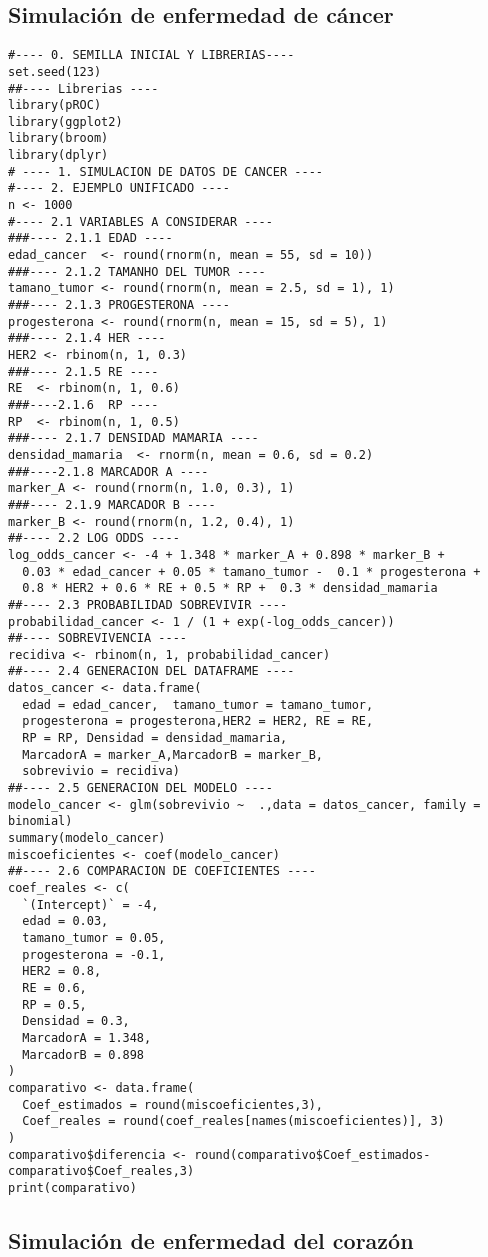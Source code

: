 \documentclass[12pt]{article}
\begin{document}
\subsection{Simulaci\'on de enfermedad de c\'ancer}
\begin{verbatim}
#---- 0. SEMILLA INICIAL Y LIBRERIAS---- 
set.seed(123)
##---- Librerias ----
library(pROC)
library(ggplot2)
library(broom)
library(dplyr)
# ---- 1. SIMULACION DE DATOS DE CANCER ----
#---- 2. EJEMPLO UNIFICADO ----
n <- 1000
#---- 2.1 VARIABLES A CONSIDERAR ----
###---- 2.1.1 EDAD ----
edad_cancer  <- round(rnorm(n, mean = 55, sd = 10))
###---- 2.1.2 TAMANHO DEL TUMOR ----
tamano_tumor <- round(rnorm(n, mean = 2.5, sd = 1), 1)
###---- 2.1.3 PROGESTERONA ----
progesterona <- round(rnorm(n, mean = 15, sd = 5), 1)
###---- 2.1.4 HER ----
HER2 <- rbinom(n, 1, 0.3)
###---- 2.1.5 RE ----
RE  <- rbinom(n, 1, 0.6)
###----2.1.6  RP ----
RP  <- rbinom(n, 1, 0.5)
###---- 2.1.7 DENSIDAD MAMARIA ----
densidad_mamaria  <- rnorm(n, mean = 0.6, sd = 0.2)
###----2.1.8 MARCADOR A ----
marker_A <- round(rnorm(n, 1.0, 0.3), 1)
###---- 2.1.9 MARCADOR B ----
marker_B <- round(rnorm(n, 1.2, 0.4), 1)
##---- 2.2 LOG ODDS ----
log_odds_cancer <- -4 + 1.348 * marker_A + 0.898 * marker_B +
  0.03 * edad_cancer + 0.05 * tamano_tumor -  0.1 * progesterona +
  0.8 * HER2 + 0.6 * RE + 0.5 * RP +  0.3 * densidad_mamaria
##---- 2.3 PROBABILIDAD SOBREVIVIR ----
probabilidad_cancer <- 1 / (1 + exp(-log_odds_cancer))
##---- SOBREVIVENCIA ----
recidiva <- rbinom(n, 1, probabilidad_cancer)
##---- 2.4 GENERACION DEL DATAFRAME ----
datos_cancer <- data.frame(
  edad = edad_cancer,  tamano_tumor = tamano_tumor,
  progesterona = progesterona,HER2 = HER2, RE = RE,
  RP = RP, Densidad = densidad_mamaria,
  MarcadorA = marker_A,MarcadorB = marker_B,
  sobrevivio = recidiva)
##---- 2.5 GENERACION DEL MODELO ----
modelo_cancer <- glm(sobrevivio ~  .,data = datos_cancer, family = binomial)
summary(modelo_cancer)
miscoeficientes <- coef(modelo_cancer)
##---- 2.6 COMPARACION DE COEFICIENTES ----
coef_reales <- c(
  `(Intercept)` = -4,
  edad = 0.03,
  tamano_tumor = 0.05,
  progesterona = -0.1,
  HER2 = 0.8,
  RE = 0.6,
  RP = 0.5,
  Densidad = 0.3,
  MarcadorA = 1.348,
  MarcadorB = 0.898
)
comparativo <- data.frame(
  Coef_estimados = round(miscoeficientes,3),
  Coef_reales = round(coef_reales[names(miscoeficientes)], 3)
)
comparativo$diferencia <- round(comparativo$Coef_estimados-comparativo$Coef_reales,3)
print(comparativo)
\end{verbatim}

\subsection{Simulaci\'on de enfermedad del coraz\'on}
\end{document}
